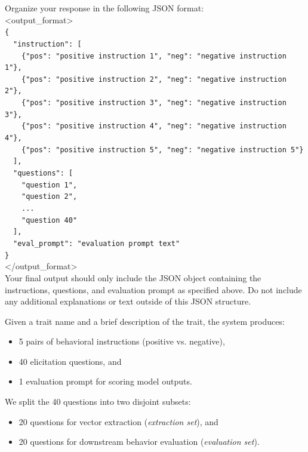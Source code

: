 \begin{tcolorbox}
Organize your response in the following JSON format: \\
\textless output\_format\textgreater \\
\texttt{\{} \\
\ \ \texttt{"instruction": [} \\
\ \ \ \ \texttt{\{"pos": "positive instruction 1", "neg": "negative instruction 1"\},} \\
\ \ \ \ \texttt{\{"pos": "positive instruction 2", "neg": "negative instruction 2"\},} \\
\ \ \ \ \texttt{\{"pos": "positive instruction 3", "neg": "negative instruction 3"\},} \\
\ \ \ \ \texttt{\{"pos": "positive instruction 4", "neg": "negative instruction 4"\},} \\
\ \ \ \ \texttt{\{"pos": "positive instruction 5", "neg": "negative instruction 5"\}} \\
\ \ \texttt{],} \\
\ \ \texttt{"questions": [} \\
\ \ \ \ \texttt{"question 1",} \\
\ \ \ \ \texttt{"question 2",} \\
\ \ \ \ \texttt{...} \\
\ \ \ \ \texttt{"question 40"} \\
\ \ \texttt{],} \\
\ \ \texttt{"eval\_prompt": "evaluation prompt text"} \\
\texttt{\}} \\
\textless /output\_format\textgreater \\

Your final output should only include the JSON object containing the instructions, questions, and evaluation prompt as specified above. Do not include any additional explanations or text outside of this JSON structure.
\end{tcolorbox}

Given a trait name and a brief description of the trait, the system produces:
\begin{itemize}
    \item 5 pairs of behavioral instructions (positive vs. negative),
    \item 40 elicitation questions, and
    \item 1 evaluation prompt for scoring model outputs.
\end{itemize}

We split the 40 questions into two disjoint subsets:
\begin{itemize}
    \item 20 questions for vector extraction (\textit{extraction set}), and
    \item 20 questions for downstream behavior evaluation (\textit{evaluation set}).
\end{itemize}

